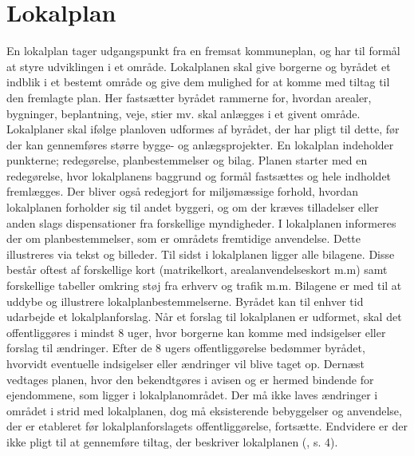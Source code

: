 \chapter{Lokalplan}
En lokalplan tager udgangspunkt fra en fremsat kommuneplan, og har til formål at styre udviklingen i et område. Lokalplanen skal give borgerne og byrådet et indblik i et bestemt område og give dem mulighed for at komme med tiltag til den fremlagte plan. Her fastsætter byrådet rammerne for, hvordan arealer, bygninger, beplantning, veje, stier mv. skal anlægges i et givent område. Lokalplaner skal ifølge planloven udformes af byrådet, der har pligt til dette, før der kan gennemføres større bygge- og anlægsprojekter.
\newline
\newline
En lokalplan indeholder punkterne; redegørelse, planbestemmelser og bilag.
\newline \indent{     }  Planen starter med en redegørelse, hvor lokalplanens baggrund og formål fastsættes og hele indholdet fremlægges. Der bliver også redegjort for miljømæssige forhold, hvordan lokalplanen forholder sig til andet byggeri, og om der kræves tilladelser eller anden slags dispensationer fra forskellige myndigheder.  
\newline \indent{     }   I lokalplanen informeres der om planbestemmelser, som er områdets fremtidige anvendelse. Dette illustreres via tekst og billeder.
\newline \indent{     }  Til sidst i lokalplanen ligger alle bilagene. Disse består oftest af forskellige kort (matrikelkort, arealanvendelseskort m.m) samt forskellige tabeller omkring støj fra erhverv og trafik m.m. Bilagene er med til at uddybe og illustrere lokalplanbestemmelserne.
\newline
\newline
Byrådet kan til enhver tid udarbejde et lokalplanforslag. Når et forslag til lokalplanen er udformet, skal det offentliggøres i mindst 8 uger, hvor borgerne kan komme med indsigelser eller forslag til ændringer. Efter de 8 ugers offentliggørelse bedømmer byrådet, hvorvidt eventuelle indsigelser eller ændringer vil blive taget op. Dernæst vedtages planen, hvor den bekendtgøres i avisen og er hermed bindende for ejendommene, som ligger i lokalplanområdet.
\newline \indent{     }  Der må ikke laves ændringer i området i strid med lokalplanen, dog må eksisterende bebyggelser og anvendelse, der er etableret før lokalplanforslagets offentliggørelse, fortsætte. Endvidere er der ikke pligt til at gennemføre tiltag, der beskriver lokalplanen (\citep{lokalplan}, s. 4).

